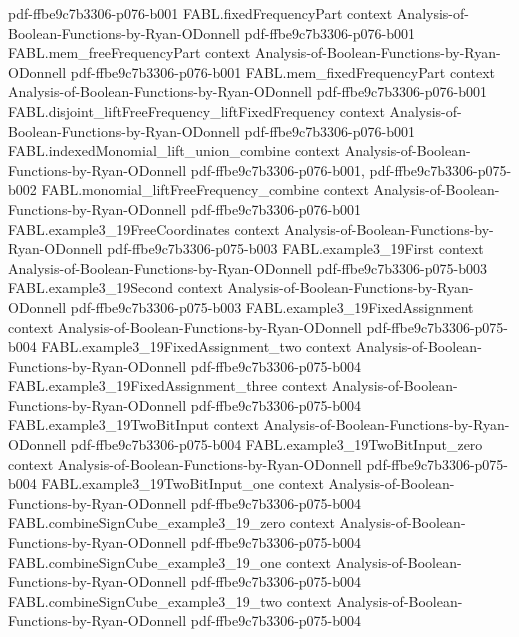 \begin{theorem}
  {pdf-ffbe9c7b3306-p076-b001}
\proofstep
  {FABL.fixedFrequencyPart}
  {context}
  {Analysis-of-Boolean-Functions-by-Ryan-ODonnell}
  {pdf-ffbe9c7b3306-p076-b001}
\proofstep
  {FABL.mem_freeFrequencyPart}
  {context}
  {Analysis-of-Boolean-Functions-by-Ryan-ODonnell}
  {pdf-ffbe9c7b3306-p076-b001}
\proofstep
  {FABL.mem_fixedFrequencyPart}
  {context}
  {Analysis-of-Boolean-Functions-by-Ryan-ODonnell}
  {pdf-ffbe9c7b3306-p076-b001}
\proofstep
  {FABL.disjoint_liftFreeFrequency_liftFixedFrequency}
  {context}
  {Analysis-of-Boolean-Functions-by-Ryan-ODonnell}
  {pdf-ffbe9c7b3306-p076-b001}
\proofstep
  {FABL.indexedMonomial_lift_union_combine}
  {context}
  {Analysis-of-Boolean-Functions-by-Ryan-ODonnell}
  {pdf-ffbe9c7b3306-p076-b001,
    pdf-ffbe9c7b3306-p075-b002}
\proofstep
  {FABL.monomial_liftFreeFrequency_combine}
  {context}
  {Analysis-of-Boolean-Functions-by-Ryan-ODonnell}
  {pdf-ffbe9c7b3306-p076-b001}
\proofstep
  {FABL.example3_19FreeCoordinates}
  {context}
  {Analysis-of-Boolean-Functions-by-Ryan-ODonnell}
  {pdf-ffbe9c7b3306-p075-b003}
\proofstep
  {FABL.example3_19First}
  {context}
  {Analysis-of-Boolean-Functions-by-Ryan-ODonnell}
  {pdf-ffbe9c7b3306-p075-b003}
\proofstep
  {FABL.example3_19Second}
  {context}
  {Analysis-of-Boolean-Functions-by-Ryan-ODonnell}
  {pdf-ffbe9c7b3306-p075-b003}
\proofstep
  {FABL.example3_19FixedAssignment}
  {context}
  {Analysis-of-Boolean-Functions-by-Ryan-ODonnell}
  {pdf-ffbe9c7b3306-p075-b004}
\proofstep
  {FABL.example3_19FixedAssignment_two}
  {context}
  {Analysis-of-Boolean-Functions-by-Ryan-ODonnell}
  {pdf-ffbe9c7b3306-p075-b004}
\proofstep
  {FABL.example3_19FixedAssignment_three}
  {context}
  {Analysis-of-Boolean-Functions-by-Ryan-ODonnell}
  {pdf-ffbe9c7b3306-p075-b004}
\proofstep
  {FABL.example3_19TwoBitInput}
  {context}
  {Analysis-of-Boolean-Functions-by-Ryan-ODonnell}
  {pdf-ffbe9c7b3306-p075-b004}
\proofstep
  {FABL.example3_19TwoBitInput_zero}
  {context}
  {Analysis-of-Boolean-Functions-by-Ryan-ODonnell}
  {pdf-ffbe9c7b3306-p075-b004}
\proofstep
  {FABL.example3_19TwoBitInput_one}
  {context}
  {Analysis-of-Boolean-Functions-by-Ryan-ODonnell}
  {pdf-ffbe9c7b3306-p075-b004}
\proofstep
  {FABL.combineSignCube_example3_19_zero}
  {context}
  {Analysis-of-Boolean-Functions-by-Ryan-ODonnell}
  {pdf-ffbe9c7b3306-p075-b004}
\proofstep
  {FABL.combineSignCube_example3_19_one}
  {context}
  {Analysis-of-Boolean-Functions-by-Ryan-ODonnell}
  {pdf-ffbe9c7b3306-p075-b004}
\proofstep
  {FABL.combineSignCube_example3_19_two}
  {context}
  {Analysis-of-Boolean-Functions-by-Ryan-ODonnell}
  {pdf-ffbe9c7b3306-p075-b004}

\end{theorem}
